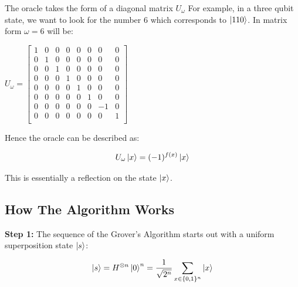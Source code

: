 \documentclass{article}
\begin{document}
\noindent
The oracle takes the form of a diagonal matrix $U_{\omega}$
\vspace{5mm}
\noindent
For example, in a three qubit state, we want to look for the number 6 which corresponds to $\ket{110}$. In matrix form $\omega =6$ will be:
\vspace{5mm}

\qquad $ U_\omega = \begin{bmatrix}

1 & 0 & 0 & 0 & 0& 0 & 0& 0 \\
0 & 1 & 0 & 0 & 0& 0 & 0& 0 \\
0 & 0 & 1 & 0 & 0& 0 & 0& 0 \\
0 & 0 & 0 & 1 & 0& 0 & 0& 0 \\
0 & 0 & 0 & 0 & 1& 0 & 0& 0 \\
0 & 0 & 0 & 0 & 0& 1 & 0& 0 \\
0 & 0 & 0 & 0 & 0& 0 & -1& 0 \\
0 & 0 & 0 & 0 & 0& 0 & 0& 1 \\

\end{bmatrix}$
\vspace{5mm}

Hence the oracle can be described as:
\vspace{5mm}

\begin{equation}
U_\omega\ket{x} = (-1)^{f(x)} \ket{x}    
\end{equation}
\vspace{5mm}

This is essentially a reflection on the state $\ket{x}$.

\pagebreak

\subsection{How The Algorithm Works}
\vspace{5mm}

\textbf{Step 1:}
\vspace{5mm}
\noindent
The sequence of the Grover's Algorithm starts out with a uniform superposition state $\ket{s}$\cite{noauthor_grovers_nodate}:
\vspace{5mm}

\begin{equation}
\ket{s}= H^{\otimes n} \ket{0}^n = \frac{1}{\sqrt{2^n}}\sum\limits_{x \in \{0,1\}^n}\ket{x}
\end{equation}
\vspace{5mm}
\end{document}
